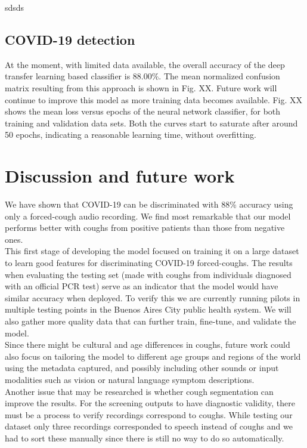 \documentclass{nle}
\begin{document}
sdsds

\subsection{COVID-19 detection}

At the moment, with limited data available, the overall accuracy of the deep transfer learning based classifier is 88.00\%. The mean normalized confusion matrix resulting from this approach is shown in Fig. XX. Future work will continue to improve this model as more training data becomes available. Fig. XX shows the mean loss versus epochs of the neural network classifier, for both training and validation data sets. Both the curves start to saturate after around 50 epochs, indicating a reasonable learning time, without overfitting.

\section{Discussion and future work}

We have shown that COVID-19 can be discriminated with 88\% accuracy using only a forced-cough audio recording. We find most remarkable that our model performs better with coughs from positive patients than those from negative ones.\\

This first stage of developing the model focused on training it on a large dataset to learn good features for discriminating COVID-19 forced-coughs. The results when evaluating the testing set (made with coughs from individuals diagnosed with an official PCR test) serve as an indicator that the model would have similar accuracy when deployed. To verify this we are currently running pilots in multiple testing points in the Buenos Aires City public health system. We will also gather more quality data that can further train, fine-tune, and validate the model.\\

Since there might be cultural and age differences in coughs, future work could also focus on tailoring the model to different age groups and regions of the world using the metadata captured, and possibly including other sounds or input modalities such as vision or natural language symptom descriptions.\\

Another issue that may be researched is whether cough segmentation can improve the results. For the screening outputs to have diagnostic validity, there must be a process to verify recordings correspond to coughs. While testing our dataset only three recordings corresponded to speech instead of coughs and we had to sort these manually since there is still no way to do so automatically.
\end{document}
